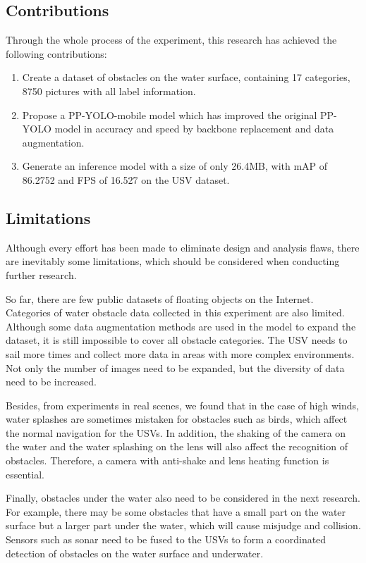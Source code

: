 \documentclass[journal,article,submit,moreauthors,pdftex]{Definitions/mdpi}
\begin{document}
\subsection{Contributions}
Through the whole process of the experiment, this research has achieved the following contributions:

\begin{enumerate}

\item Create a dataset of obstacles on the water surface, containing 17 categories, 8750 pictures with all label information.
\item Propose a PP-YOLO-mobile model which has improved the original PP-YOLO model in accuracy and speed by backbone replacement and data augmentation.
\item Generate an inference model with a size of only 26.4MB, with mAP of 86.2752 and FPS of 16.527 on the USV dataset.

\end{enumerate}

\subsection{Limitations}
Although every effort has been made to eliminate design and analysis flaws, there are inevitably some limitations, which should be considered when conducting further research.

So far, there are few public datasets of floating objects on the Internet. Categories of water obstacle data collected in this experiment are also limited. Although some data augmentation methods are used in the model to expand the dataset, it is still impossible to cover all obstacle categories. The USV needs to sail more times and collect more data in areas with more complex environments. Not only the number of images need to be expanded, but the diversity of data need to be increased.

Besides, from experiments in real scenes, we found that in the case of high winds, water splashes are sometimes mistaken for obstacles such as birds, which affect the normal navigation for the USVs. In addition, the shaking of the camera on the water and the water splashing on the lens will also affect the recognition of obstacles. Therefore, a camera with anti-shake and lens heating function is essential.

Finally, obstacles under the water also need to be considered in the next research. For example, there may be some obstacles that have a small part on the water surface but a larger part under the water, which will cause misjudge and collision. Sensors such as sonar need to be fused to the USVs to form a coordinated detection of obstacles on the water surface and underwater.
\end{document}
